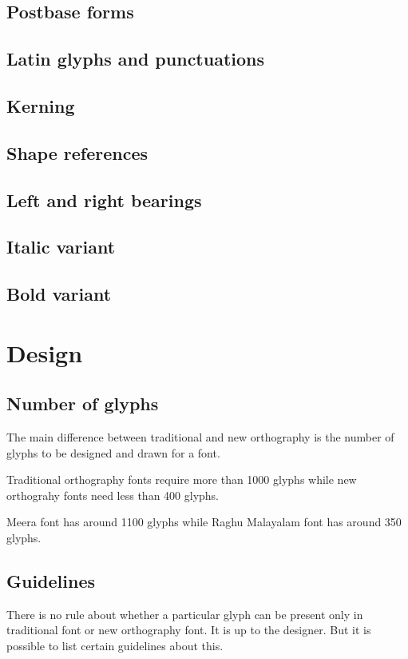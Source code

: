 \subsection {Postbase forms}
\subsection {Latin glyphs and punctuations}
\subsection {Kerning}
\subsection {Shape references}
\subsection {Left and right bearings}
\subsection {Italic variant}
\subsection {Bold variant}

\section{Design}
\subsection{Number of glyphs}

The main difference between traditional and new orthography is the number of
glyphs to be designed and drawn for a font.

Traditional orthography fonts require more than 1000 glyphs while new orthograhy
fonts need less than 400 glyphs.

Meera font has around 1100 glyphs while Raghu Malayalam font has around 350
glyphs.

\subsection{Guidelines}

There is no rule about whether a particular glyph can be present only in
traditional font or new orthography font. It is up to the designer. But it is
possible to list certain guidelines about this.

